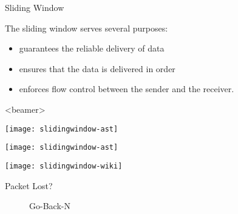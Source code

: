 \begin{frame}{Sliding Window}
  \begin{center}
  \end{center}
  \begin{iblock}{The sliding window serves several purposes:}
    \begin{itemize}
    \item guarantees the reliable delivery of data
    \item ensures that the data is delivered in order
    \item enforces flow control between the sender and the receiver.
    \end{itemize}
  \end{iblock}
\end{frame}

\begin{frame}<beamer>
  \begin{center}
    \texttt{[image: slidingwindow-ast]}
  \end{center}
\end{frame}


\begin{minipage}{.48\linewidth}
  \texttt{[image: slidingwindow-ast]}  
\end{minipage}\hfill
\begin{minipage}{.48\linewidth}
  \texttt{[image: slidingwindow-wiki]}
\end{minipage}

\begin{frame}
  \begin{minipage}{.4\linewidth}
    \begin{description}
    \item[Packet Lost?] Go-Back-N
    \end{description}
  \end{minipage}\qquad
  \begin{minipage}{.4\linewidth}
  \end{minipage}
\end{frame}

